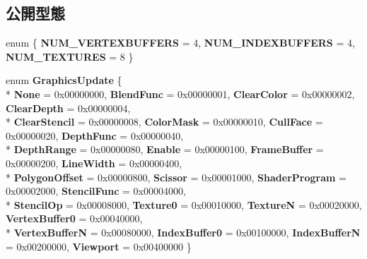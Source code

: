 \subsection*{公開型態}
\begin{DoxyCompactItemize}
\item 
enum \{ {\bfseries N\+U\+M\+\_\+\+V\+E\+R\+T\+E\+X\+B\+U\+F\+F\+E\+RS} = 4, 
{\bfseries N\+U\+M\+\_\+\+I\+N\+D\+E\+X\+B\+U\+F\+F\+E\+RS} = 4, 
{\bfseries N\+U\+M\+\_\+\+T\+E\+X\+T\+U\+R\+ES} = 8
 \}\hypertarget{class_i_dream_sky_1_1_g_x_context_a04af9252d6786dcb6ed5a798ee1b5657}{}\label{class_i_dream_sky_1_1_g_x_context_a04af9252d6786dcb6ed5a798ee1b5657}

\item 
enum {\bfseries Graphics\+Update} \{ \\*
{\bfseries None} = 0x00000000, 
{\bfseries Blend\+Func} = 0x00000001, 
{\bfseries Clear\+Color} = 0x00000002, 
{\bfseries Clear\+Depth} = 0x00000004, 
\\*
{\bfseries Clear\+Stencil} = 0x00000008, 
{\bfseries Color\+Mask} = 0x00000010, 
{\bfseries Cull\+Face} = 0x00000020, 
{\bfseries Depth\+Func} = 0x00000040, 
\\*
{\bfseries Depth\+Range} = 0x00000080, 
{\bfseries Enable} = 0x00000100, 
{\bfseries Frame\+Buffer} = 0x00000200, 
{\bfseries Line\+Width} = 0x00000400, 
\\*
{\bfseries Polygon\+Offset} = 0x00000800, 
{\bfseries Scissor} = 0x00001000, 
{\bfseries Shader\+Program} = 0x00002000, 
{\bfseries Stencil\+Func} = 0x00004000, 
\\*
{\bfseries Stencil\+Op} = 0x00008000, 
{\bfseries Texture0} = 0x00010000, 
{\bfseries TextureN} = 0x00020000, 
{\bfseries Vertex\+Buffer0} = 0x00040000, 
\\*
{\bfseries Vertex\+BufferN} = 0x00080000, 
{\bfseries Index\+Buffer0} = 0x00100000, 
{\bfseries Index\+BufferN} = 0x00200000, 
{\bfseries Viewport} = 0x00400000
 \}\hypertarget{class_i_dream_sky_1_1_g_x_context_aa2a9b77d7ab121a51ed6c60fa151a128}{}\label{class_i_dream_sky_1_1_g_x_context_aa2a9b77d7ab121a51ed6c60fa151a128}

\end{DoxyCompactItemize}
